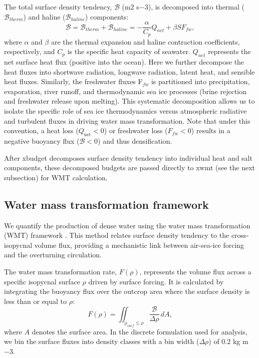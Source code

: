 \documentclass[draft]{agujournal2025}
\begin{document}
The total surface density tendency, $\mathcal{B}$ (m$2$ s${-3}$), is decomposed into thermal ($\mathcal{B}_{therm}$) and haline ($\mathcal{B}_{haline}$) components:
\begin{equation}
\mathcal{B} = \mathcal{B}_{therm} + \mathcal{B}_{haline} = -\frac{\alpha}{C_p} Q_{net} + \beta S F_{fw},
\end{equation}
where $\alpha$ and $\beta$ are the thermal expansion and haline contraction coefficients, respectively, and $C_p$ is the specific heat capacity of seawater. $Q_{net}$ represents the net surface heat flux (positive into the ocean). Here we further decompose the heat fluxes into shortwave radiation, longwave radiation, latent heat, and sensible heat fluxes. Similarly, the freshwater fluxes F$_{fw}$ is partitioned into precipitation, evaporation, river runoff, and thermodynamic sea ice processes (brine rejection and freshwater release upon melting). This systematic decomposition allows us to isolate the specific role of sea ice thermodynamics versus atmospheric radiative and turbulent fluxes in driving water mass transformation. Note that under this convention, a heat loss ($Q_{\text{net}} < 0$) or freshwater loss ($F_{fw} < 0$) results in a negative buoyancy flux ($\mathcal{B} < 0$) and thus densification.



After xbudget decomposes surface density tendency into individual heat and salt components, these decomposed budgets are passed directly to xwmt (see the next subsection) for WMT calculation.


\subsection{Water mass transformation framework}

We quantify the production of dense water using the water mass transformation (WMT) framework \cite{Walin1982,Speer1992}. This method relates surface density tendency to the cross-isopycnal volume flux, providing a mechanistic link between air-sea-ice forcing and the overturning circulation.

The water mass transformation rate, $F(\rho)$, represents the volume flux across a specific isopycnal surface $\rho$ driven by surface forcing. It is calculated by integrating the buoyancy flux over the outcrop area where the surface density is less than or equal to $\rho$:
\begin{equation}
F(\rho) = \iint_{\rho_{surf} \le \rho} \frac{\mathcal{B}}{\Delta \rho} \, dA,
\end{equation}
where $A$ denotes the surface area. In the discrete formulation used for analysis, we bin the surface fluxes into density classes with a bin width ($\Delta \rho$) of 0.2 kg m${-3}$.
\end{document}
